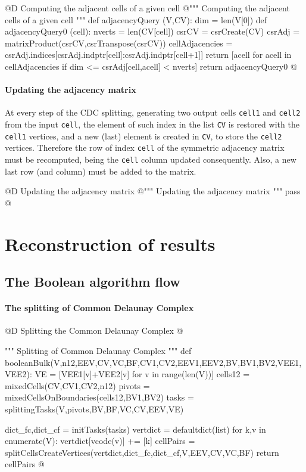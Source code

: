 \documentclass[11pt,oneside]{article}	%
\begin{document}
@D Computing the adjacent cells of a given cell
@{""" Computing the adjacent cells of a given cell """
def adjacencyQuery (V,CV):
	dim = len(V[0])
	def adjacencyQuery0 (cell):
		nverts = len(CV[cell])
		csrCV =  csrCreate(CV)
		csrAdj = matrixProduct(csrCV,csrTranspose(csrCV))
		cellAdjacencies = csrAdj.indices[csrAdj.indptr[cell]:csrAdj.indptr[cell+1]]
		return [acell for acell in cellAdjacencies if dim <= csrAdj[cell,acell] < nverts]
	return adjacencyQuery0
@}

\paragraph{Updating the adjacency matrix}
At every step of the CDC splitting, generating two output cells \texttt{cell1} and  \texttt{cell2} from the input  \texttt{cell}, the element of such index in the list \texttt{CV} is restored with the \texttt{cell1} vertices, and a new (last) element is created in \texttt{CV}, to store the \texttt{cell2} vertices.
Therefore the row of index \texttt{cell} of the symmetric  adjacency matrix must be recomputed, being the \texttt{cell} column updated consequently. Also, a new last row (and column) must be added to the matrix. 

@D Updating the adjacency matrix
@{""" Updating the adjacency matrix """
pass
@}


\section{Reconstruction of results}


\subsection{The Boolean algorithm flow}


\paragraph{The splitting of Common Delaunay Complex}

@D Splitting the Common Delaunay Complex
@{""" Splitting of Common Delaunay Complex """
def booleanBulk(V,n12,EEV,CV,VC,BF,CV1,CV2,EEV1,EEV2,BV,BV1,BV2,VEE1,VEE2):
	VE = [VEE1[v]+VEE2[v] for v in range(len(V))]
	cells12 = mixedCells(CV,CV1,CV2,n12)
	pivots = mixedCellsOnBoundaries(cells12,BV1,BV2)
	tasks = splittingTasks(V,pivots,BV,BF,VC,CV,EEV,VE)
		
	dict_fc,dict_cf = initTasks(tasks)
	vertdict = defaultdict(list)
	for k,v in enumerate(V): vertdict[vcode(v)] += [k]
	cellPairs = splitCellsCreateVertices(vertdict,dict_fc,dict_cf,V,EEV,CV,VC,BF)
	return cellPairs
@}
\end{document}

